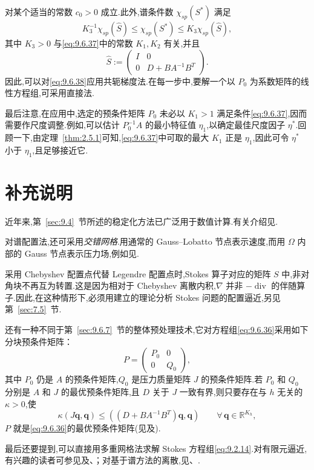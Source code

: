 对某个适当的常数 \(c_0>0\) 成立.此外,谱条件数 \(\chi_{sp}(S^*)\) 满足
\[
  K_3^{-1}\chi_{sp}(\widehat S)\le\chi_{sp}(S^*)\le K_3\chi_{sp}(\widehat S),
\]
其中 \(K_3>0\) 与\eqref{eq:9.6.37}中的常数 \(K_1,K_2\) 有关,并且
\[
  \widehat S:=\begin{pmatrix}I&0\\0&D+BA^{-1}B^T\end{pmatrix}.
\]
因此,可以对\eqref{eq:9.6.38}应用共轭梯度法.在每一步中,要解一个以 \(P_0\) 为系数矩阵的线性方程组,可采用直接法.

最后注意,在应用中,选定的预条件矩阵 \(P_0\) 未必以 \(K_1>1\) 满足条件\eqref{eq:9.6.37},因而需要作尺度调整.例如,可以估计 \(P_0^{-1}A\) 的最小特征值 \(\eta_1\),以确定最佳尺度因子 \(\eta^*\).回顾一下,由定理~\ref{thm:2.5.1}可知,\eqref{eq:9.6.37}中可取的最大 \(K_1\) 正是 \(\eta_1\),因此可令 \(\eta^*\) 小于 \(\eta_1\),且足够接近它.

\section{补充说明}\label{sec:9.7}

近年来,第~\ref{sec:9.4}~节所述的稳定化方法已广泛用于数值计算.有关介绍见.

对谱配置法,还可采用\emph{交错网格}.用通常的 Gauss--Lobatto 节点表示速度,而用 \(\Omega\) 内部的 Gauss 节点表示压力场,例如见.

采用 Chebyshev 配置点代替 Legendre 配置点时,Stokes 算子对应的矩阵 \(S\) 中,非对角块不再互为转置.这是因为相对于 Chebyshev 离散内积,\(\nabla\) 并非 \(-\operatorname{div}\) 的伴随算子.因此,在这种情形下,必须用建立的理论分析 Stokes 问题的配置逼近,另见第~\ref{sec:7.5}~节.

还有一种不同于第~\ref{sec:9.6.7}~节的整体预处理技术,它对方程组\eqref{eq:9.6.36}采用如下分块预条件矩阵：
\[
  P=\begin{pmatrix}P_0&0\\0&Q_0\end{pmatrix},
\]
其中 \(P_0\) 仍是 \(A\) 的预条件矩阵,\(Q_0\) 是压力质量矩阵 \(J\) 的预条件矩阵.若 \(P_0\) 和 \(Q_0\) 分别是 \(A\) 和 \(J\) 的最优预条件矩阵,且 \(D\) 关于 \(J\) 一致有界,则只要存在与 \(h\) 无关的 \(\kappa>0\),使
\[
  \kappa(J\boldsymbol{q},\boldsymbol{q})
       \le((D+BA^{-1}B^T)\boldsymbol{q},\boldsymbol{q})
       \qquad\forall\,\boldsymbol{q}\in\mathbb R^{K_h},
\]
\(P\) 就是\eqref{eq:9.6.36}的最优预条件矩阵(见及).

最后还要提到,可以直接用多重网格法求解 Stokes 方程组\eqref{eq:9.2.14}.对有限元逼近,有兴趣的读者可参见及、；对基于谱方法的离散,见、.
